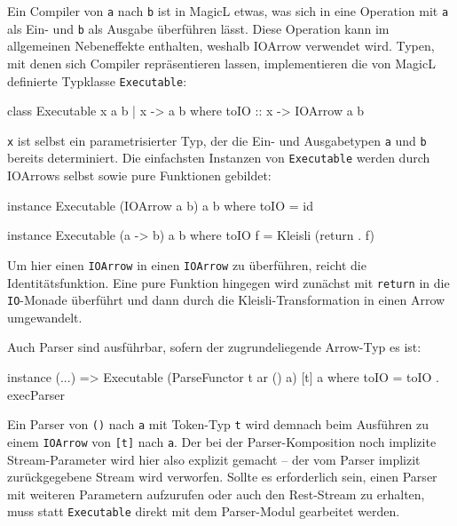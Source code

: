 \documentclass[12pt, a4paper, bibgerm]{scrbook}
\newenvironment{DIFnomarkup}{}{}
\newcommand\icode[1]{\lstinline?#1?}
\begin{document}
Ein Compiler von \icode{a} nach \icode{b} ist in MagicL etwas, was sich
in eine Operation mit \icode{a} als Ein- und \icode{b} als Ausgabe
überführen lässt. Diese Operation kann im allgemeinen Nebeneffekte
enthalten, weshalb IOArrow verwendet wird. Typen, mit denen sich
Compiler repräsentieren lassen, implementieren die von MagicL definierte
Typklasse \icode{Executable}:
\begin{DIFnomarkup}\begin{code}
class Executable x a b | x -> a b where
  toIO :: x -> IOArrow a b
\end{code}\end{DIFnomarkup}
\icode{x} ist selbst ein parametrisierter Typ, der die Ein- und
Ausgabetypen \icode{a} und \icode{b} bereits determiniert. Die einfachsten
Instanzen von \icode{Executable} werden durch IOArrows selbst sowie pure
Funktionen gebildet:
\begin{DIFnomarkup}\begin{code}
instance Executable (IOArrow a b) a b where
  toIO = id

instance Executable (a -> b) a b where
  toIO f = Kleisli (return . f)
\end{code}\end{DIFnomarkup}
Um hier einen \icode{IOArrow} in einen \icode{IOArrow} zu überführen,
reicht die Identitätsfunktion. Eine pure Funktion hingegen wird zunächst
mit \icode{return} in die \icode{IO}-Monade überführt und dann durch die
Kleisli-Transformation in einen Arrow umgewandelt.

Auch Parser sind ausführbar, sofern der zugrundeliegende Arrow-Typ es
ist:
\begin{DIFnomarkup}\begin{code}
instance (...) => Executable (ParseFunctor t ar () a) [t] a where
  toIO = toIO . execParser
\end{code}\end{DIFnomarkup}
Ein Parser von \icode{()} nach \icode{a} mit Token-Typ \icode{t} wird
demnach beim Ausführen zu einem \icode{IOArrow} von \icode{[t]} nach
\icode{a}. Der bei der Parser-Komposition noch implizite
Stream-Parameter wird hier also explizit gemacht -- der vom Parser
implizit zurückgegebene Stream wird verworfen. Sollte es erforderlich
sein, einen Parser mit weiteren Parametern aufzurufen oder auch den
Rest-Stream zu erhalten, muss statt \icode{Executable} direkt mit dem
Parser-Modul gearbeitet werden.
\end{document}
